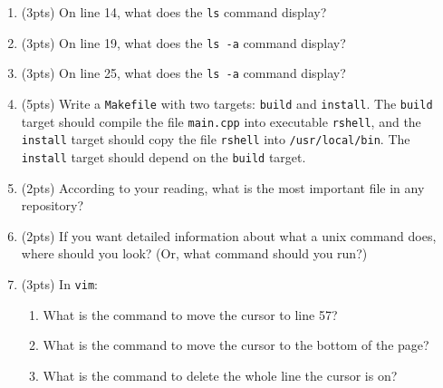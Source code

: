 \documentclass{article}
\begin{document}
\begin{enumerate}
\item
(3pts)
On line 14, what does the \lstinline{ls} command display?
\vspace{0.5in}

\item
(3pts)
On line 19, what does the \lstinline{ls -a} command display?
\vspace{0.5in}

\item
(3pts)
On line 25, what does the \lstinline{ls -a} command display?
\vspace{0.5in}

\newpage
\item
(5pts)
Write a \lstinline{Makefile} with two targets: \lstinline{build} and \lstinline{install}.
The \lstinline{build} target should compile the file \lstinline{main.cpp} into executable \lstinline{rshell},
and the \lstinline{install} target should copy the file \lstinline{rshell} into \lstinline{/usr/local/bin}.
The \lstinline{install} target should depend on the \lstinline{build} target.
\vspace{4in}

\item
(2pts)
According to your reading, what is the most important file in any repository?
\vspace{1in}

\item
(2pts)
If you want detailed information about what a unix command does, where should you look?
(Or, what command should you run?)
\vspace{1in}

\item
(3pts)
In \lstinline{vim}:
\begin{enumerate}

\item
What is the command to move the cursor to line 57?
\vspace{0.5in}

\item
What is the command to move the cursor to the bottom of the page?
\vspace{0.5in}

\item
What is the command to delete the whole line the cursor is on?
\vspace{0.5in}
\end{enumerate}

\end{enumerate}
\end{document}
